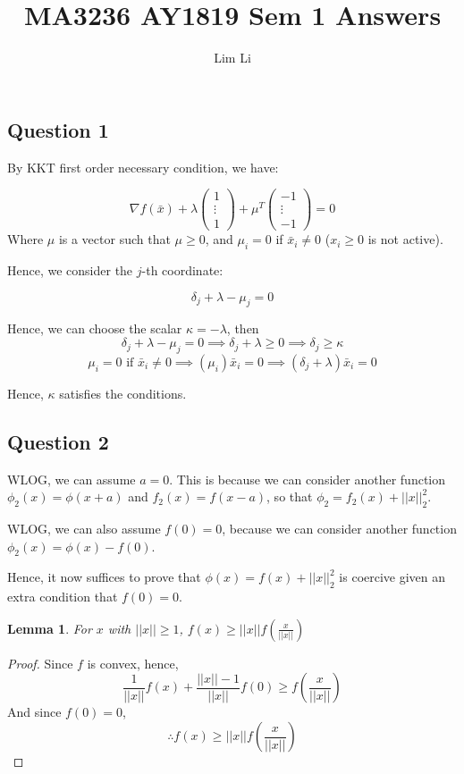 \documentclass{article}
\newtheorem{lemma}{Lemma}
\begin{document}
\title{MA3236 AY1819 Sem 1 Answers}
\author{Lim Li}
\maketitle

\subsection*{Question 1}

By KKT first order necessary condition, we have:

\[\nabla f(\bar{x}) + \lambda \begin{pmatrix}
1 \\ \vdots \\ 1
\end{pmatrix} + \mu^T \begin{pmatrix}
-1 \\ \vdots \\ -1
\end{pmatrix} = 0\]
Where $\mu$ is a vector such that $\mu \geq 0$, and $\mu_i = 0$ if $\bar{x}_i \neq 0$ ($x_i \geq 0$ is not active).

Hence, we consider the $j$-th coordinate:

\[\delta_j + \lambda - \mu_j = 0\]

Hence, we can choose the scalar $\kappa = -\lambda$, then
\[\delta_j + \lambda - \mu_j = 0 \implies \delta_j + \lambda \geq 0 \implies \delta_j \geq \kappa\]
\[\mu_i = 0 \text{ if } \bar{x}_i \neq 0 \implies (\mu_i)\bar{x}_i = 0 \implies (\delta_j + \lambda)\bar{x}_i = 0\]

Hence, $\kappa$ satisfies the conditions.

\subsection*{Question 2}

WLOG, we can assume $a=0$. This is because we can consider another function $\phi_2(x) = \phi(x+a)$ and $f_2(x) = f(x-a)$, so that $\phi_2 = f_2(x) + ||x||_2^2$.

WLOG, we can also assume $f(0)=0$, because we can consider another function $\phi_2(x) = \phi(x) - f(0)$.

Hence, it now suffices to prove that $\phi(x) = f(x) + ||x||_2^2$ is coercive given an extra condition that $f(0)=0$.

\begin{lemma}
For $x$ with $||x|| \geq 1$, $f(x) \geq ||x||f(\frac{x}{||x||})$
\end{lemma}
\begin{proof}
Since $f$ is convex, hence,
\[\frac{1}{||x||}f(x) + \frac{||x||-1}{||x||}f(0) \geq f(\frac{x}{||x||})\]
And since $f(0)=0$,
\[\therefore f(x) \geq ||x||f(\frac{x}{||x||})\]
\end{proof}
\end{document}
